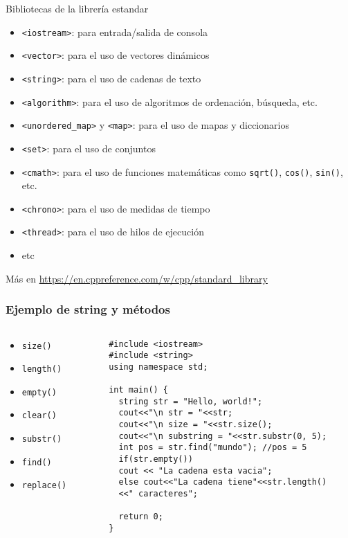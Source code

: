 \documentclass{beamer}
\begin{document}
\begin{frame}{Bibliotecas de la librería estandar}

\begin{itemize}
\item \texttt{<iostream>}: para entrada/salida de consola
\item \texttt{<vector>}: para el uso de vectores dinámicos
\item \texttt{<string>}: para el uso de cadenas de texto
\item \texttt{<algorithm>}: para el uso de algoritmos de ordenación, búsqueda, etc.
\item \texttt{<unordered\_map>} y \texttt{<map>}: para el uso de mapas y diccionarios
\item \texttt{<set>}: para el uso de conjuntos
\item \texttt{<cmath>}: para el uso de funciones matemáticas como \texttt{sqrt()}, \texttt{cos()}, \texttt{sin()}, etc.
\item \texttt{<chrono>}: para el uso de medidas de tiempo
\item \texttt{<thread>}: para el uso de hilos de ejecución
\item etc
\end{itemize}

Más en \url{https://en.cppreference.com/w/cpp/standard_library}

\end{frame}

\begin{frame}[fragile]
  \frametitle{Ejemplo de string y métodos}
  \begin{columns}
    \begin{column}{0.3\textwidth}
      \begin{itemize}
        \item \texttt{size()}
        \item \texttt{length()}
        \item \texttt{empty()}
        \item \texttt{clear()}
        \item \texttt{substr()}
        \item \texttt{find()}
        \item \texttt{replace()}
      \end{itemize}
    \end{column}
    \begin{column}{0.7\textwidth}
      \begin{verbatim}
#include <iostream>
#include <string>
using namespace std;

int main() {
  string str = "Hello, world!";
  cout<<"\n str = "<<str;
  cout<<"\n size = "<<str.size();
  cout<<"\n substring = "<<str.substr(0, 5);
  int pos = str.find("mundo"); //pos = 5
  if(str.empty()) 
  cout << "La cadena esta vacia";
  else cout<<"La cadena tiene"<<str.length()
  <<" caracteres";

  return 0;
}
      \end{verbatim}
    \end{column}
  \end{columns}
\end{frame}
\end{document}
